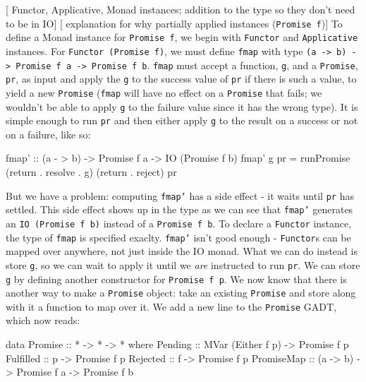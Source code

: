 \documentclass[12pt, english, letterpaper]{kuthesis}
\newcommand{\lit}[1]{\texttt{#1}}
\begin{document}
[ Functor, Applicative, Monad instances; addition to the type so they don't need to be in IO]
[ explanation for why partially applied instances (\lit{Promise f})]
To define a Monad instance for \lit{Promise f}, we begin with \lit{Functor} and \lit{Applicative} instances.  For \lit{Functor (Promise f)}, we must define \lit{fmap} with type \lit{(a -> b) -> Promise f a -> Promise f b}.  \lit{fmap} must accept a function, \lit g, and a \lit{Promise}, \lit{pr}, as input and apply the \lit g to the success value of \lit{pr} if there is such a value, to yield a new \lit{Promise} (\lit{fmap} will have no effect on a \lit{Promise} that fails; we wouldn't be able to apply \lit g to the failure value since it has the wrong type).  It is simple enough to run \lit{pr} and then either apply \lit g to the result on a success or not on a failure, like so:
\begin{code}
  fmap' :: (a - > b) -> Promise f a -> IO (Promise f b)
  fmap' g pr = runPromise (return . resolve . g) (return . reject) pr
\end{code}
But we have a problem: computing \lit{fmap'} has a side effect - it waits until \lit{pr} has settled.  This side effect shows up in the type as we can see that \lit{fmap'} generates an \lit{IO (Promise f b)} instead of a \lit{Promise f b}.  To declare a \lit{Functor} instance, the type of \lit{fmap} is specified exaclty.  \lit{fmap'} isn't good enough  - \lit{Functor}s can be mapped over anywhere, not just inside the IO monad.  What we can do instead is store \lit g, so we can wait to apply it until we \emph{are} instructed to run \lit{pr}.  We can store \lit g by defining another constructor for \lit{Promise f p}.  We now know that there is another way to make a \lit{Promise} object: take an existing \lit{Promise} and store along with it a function to map over it.  We add a new line to the \lit{Promise} GADT, which now reads:
\begin{code}
data Promise :: * -> * -> * where
    Pending :: MVar (Either f p) -> Promise f p
    Fulfilled :: p -> Promise f p
    Rejected :: f -> Promise f p
    PromiseMap :: (a -> b) -> Promise f a -> Promise f b
\end{code}
\end{document}
